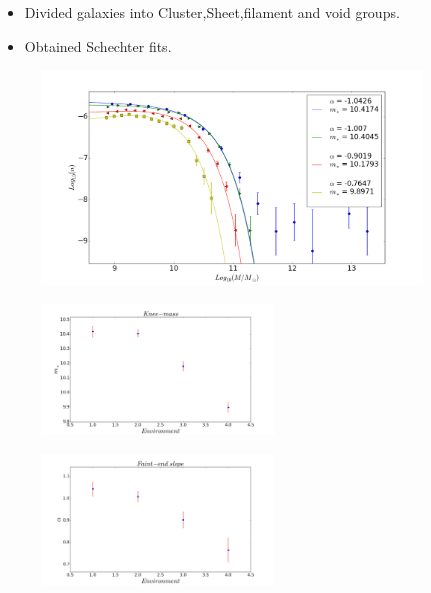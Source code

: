 \documentclass[xcolor=dvipsnames]{beamer}
\begin{document}
\begin{frame}
\begin{itemize}
			\item Divided galaxies into Cluster,Sheet,filament and void groups.
			\item Obtained Schechter fits.
\end{itemize}
\begin{figure}[h!]
\centering
\includegraphics[width=0.9\textwidth]{environment2}
\centering
\end{figure}
\end{frame}

\begin{frame}
\begin{figure}[h!]
        \includegraphics[width=0.55\textwidth]{m2}
\end{figure}
\begin{figure}[h!]
	\includegraphics[width=0.55\textwidth]{alpha2}
\end{figure}
\end{frame}
\end{document}
